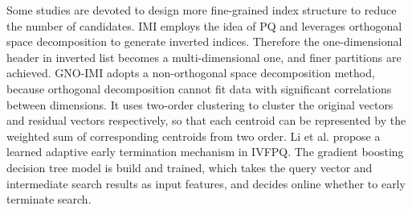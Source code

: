 \documentclass[11pt]{article}
\begin{document}
Some studies are devoted to design more fine-grained index structure to reduce the number of candidates. IMI \cite{DBLP:journals/pami/BabenkoL15} employs the idea of PQ and leverages orthogonal space decomposition to generate inverted indices. Therefore the one-dimensional header in inverted list becomes a multi-dimensional one, and finer partitions are achieved. GNO-IMI \cite{DBLP:conf/cvpr/YandexL16} adopts a non-orthogonal space decomposition method, because orthogonal decomposition cannot fit data with significant correlations between dimensions. It uses two-order clustering to cluster the original vectors and residual vectors respectively, so that each centroid can be represented by the weighted sum of corresponding centroids from two order. Li et al. \cite{DBLP:conf/sigmod/LiZAH20} propose a learned adaptive early termination mechanism in IVFPQ. The gradient boosting decision tree model is build and trained, which takes the query vector and intermediate search results as input features, and decides online whether to early terminate search.
%
\end{document}
